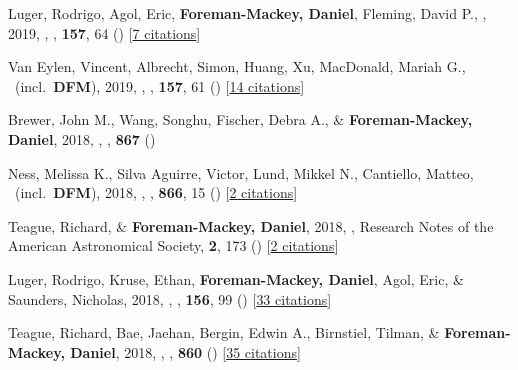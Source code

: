\item[{\color{numcolor}\scriptsize41}] Luger, Rodrigo, Agol, Eric, \textbf{Foreman-Mackey, Daniel}, Fleming, David P., \etal, 2019, , \aj, \textbf{157}, 64 () [\href{http://adsabs.harvard.edu/abs/2019AJ....157...64L}{7 citations}]

\item[{\color{numcolor}\scriptsize40}] Van Eylen, Vincent, Albrecht, Simon, Huang, Xu, MacDonald, Mariah G., \etal\ (incl.\ \textbf{DFM}), 2019, , \aj, \textbf{157}, 61 () [\href{http://adsabs.harvard.edu/abs/2019AJ....157...61V}{14 citations}]

\item[{\color{numcolor}\scriptsize39}] Brewer, John M., Wang, Songhu, Fischer, Debra A., \& \textbf{Foreman-Mackey, Daniel}, 2018, , \apj, \textbf{867} ()

\item[{\color{numcolor}\scriptsize38}] Ness, Melissa K., Silva Aguirre, Victor, Lund, Mikkel N., Cantiello, Matteo, \etal\ (incl.\ \textbf{DFM}), 2018, , \apj, \textbf{866}, 15 () [\href{http://adsabs.harvard.edu/abs/2018ApJ...866...15N}{2 citations}]

\item[{\color{numcolor}\scriptsize37}] Teague, Richard, \& \textbf{Foreman-Mackey, Daniel}, 2018, , Research Notes of the American Astronomical Society, \textbf{2}, 173 () [\href{http://adsabs.harvard.edu/abs/2018RNAAS...2c.173T}{2 citations}]

\item[{\color{numcolor}\scriptsize36}] Luger, Rodrigo, Kruse, Ethan, \textbf{Foreman-Mackey, Daniel}, Agol, Eric, \& Saunders, Nicholas, 2018, , \aj, \textbf{156}, 99 () [\href{http://adsabs.harvard.edu/abs/2018AJ....156...99L}{33 citations}]

\item[{\color{numcolor}\scriptsize35}] Teague, Richard, Bae, Jaehan, Bergin, Edwin A., Birnstiel, Tilman, \& \textbf{Foreman-Mackey, Daniel}, 2018, , \apj, \textbf{860} () [\href{http://adsabs.harvard.edu/abs/2018ApJ...860L..12T}{35 citations}]

